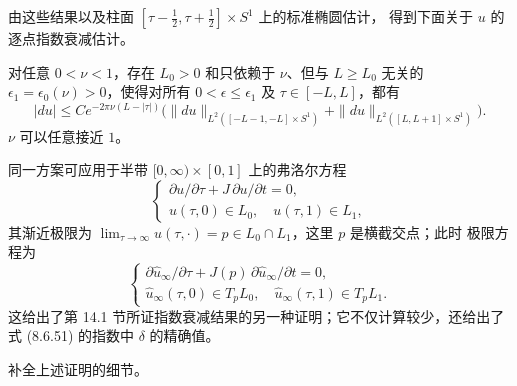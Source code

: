 由这些结果以及柱面 $[\tau-\tfrac12,\tau+\tfrac12]\times S^1$ 上的标准椭圆估计，
得到下面关于 $u$ 的逐点指数衰减估计。

\begin{corollary}
\label{cor:app-b-pointwise-decay}
对任意 $0<\nu<1$，存在 $L_0>0$ 和只依赖于 $\nu$、但与 $L\geq L_0$ 无关的
$\epsilon_1=\epsilon_0(\nu)>0$，使得对所有 $0<\epsilon\leq\epsilon_1$ 及
$\tau\in[-L,L]$，都有
\[
 |du|\leq Ce^{-2\pi\nu(L-|\tau|)}
 \bigl(
  \|du\|_{L^2([-L-1,-L]\times S^1)}
  +\|du\|_{L^2([L,L+1]\times S^1)}
 \bigr).
\]
$\nu$ 可以任意接近 $1$。
\end{corollary}

\begin{remark}
同一方案可应用于半带 $[0,\infty)\times[0,1]$ 上的弗洛尔方程
\[
 \begin{cases}
 \partial u/\partial\tau+J\,\partial u/\partial t=0,\\
 u(\tau,0)\in L_0,\quad u(\tau,1)\in L_1,
 \end{cases}
\]
其渐近极限为
$\lim_{\tau\to\infty}u(\tau,\cdot)=p\in L_0\cap L_1$，这里 $p$ 是横截交点；此时
极限方程为
\[
 \begin{cases}
 \partial\widehat u_\infty/\partial\tau
 +J(p)\,\partial\widehat u_\infty/\partial t=0,\\
 \widehat u_\infty(\tau,0)\in T_pL_0,\quad
 \widehat u_\infty(\tau,1)\in T_pL_1.
 \end{cases}
\]
这给出了第 14.1 节所证指数衰减结果的另一种证明；它不仅计算较少，还给出了
式 (8.6.51) 的指数中 $\delta$ 的精确值。
\end{remark}

\begin{exercise}
补全上述证明的细节。
\end{exercise}
